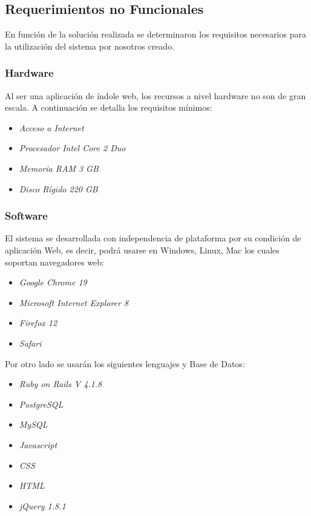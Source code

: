 \documentclass[runningheads,a4paper,spanish]{llncs}
\begin{document}
\begin{verbatim}

\end{verbatim}

\subsection{Requerimientos no Funcionales}
En función de la solución realizada se determinaron los requisitos necesarios para la utilización del sistema por nosotros creado.
\subsubsection{Hardware}
Al ser una aplicación de índole web, los recursos a nivel hardware no son de gran escala. A continuación se detalla los requisitos mínimos:
\begin{itemize}
	\item \textit{Acceso a Internet}
	\item \textit{Procesador Intel Core 2 Duo}
	\item \textit{Memoria RAM 3 GB}
	\item \textit{Disco Rígido 220 GB}
\end{itemize}
\subsubsection{Software}
El sistema se desarrollada con independencia de plataforma por su condición de aplicación Web, es decir, podrá usarse en Windows, Linux, Mac los cuales soportan navegadores web:
	\begin{itemize}
		\item \textit{Google Chrome 19}
		\item \textit{Microsoft Internet Explorer 8}
		\item \textit{Firefox 12}
		\item \textit{Safari}
	\end{itemize}
\begin{flushleft}
	Por otro lado se usarán los siguientes lenguajes y Base de Datos: 
\end{flushleft}
	\begin{itemize}
		\item \textit{Ruby on Rails  V 4.1.8} 
		\item \textit{PostgreSQL}
		\item \textit{MySQL}
		\item \textit{Javascript }
		\item \textit{CSS}
		\item \textit{HTML}
		\item \textit{jQuery 1.8.1}
	\end{itemize}
\end{document}
